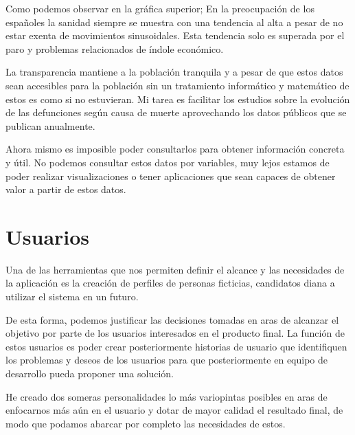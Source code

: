 Como podemos observar en la gráfica superior; En la preocupación de los españoles la sanidad siempre se muestra con una tendencia al alta a pesar de no estar exenta de movimientos sinusoidales. Esta tendencia solo es superada por el paro y problemas relacionados de índole económico.

La transparencia mantiene a la población tranquila y a pesar de que estos datos sean accesibles para la población sin un tratamiento informático y matemático de estos es como si no estuvieran. Mi tarea es facilitar los estudios sobre la evolución de las defunciones según causa de muerte aprovechando los datos públicos que se publican anualmente.

Ahora mismo es imposible poder consultarlos para obtener información concreta y útil. No podemos consultar estos datos por variables, muy lejos estamos de poder realizar visualizaciones o tener aplicaciones que sean capaces de obtener valor a partir de estos datos.

\section{Usuarios}
\label{sec:usu}
Una de las herramientas que nos permiten definir el alcance y las necesidades de la aplicación es la creación de perfiles de personas ficticias, candidatos diana a utilizar el sistema en un futuro.

De esta forma, podemos justificar las decisiones tomadas en aras de alcanzar el objetivo por parte de los usuarios interesados en el producto final. La función de estos usuarios es poder crear posteriormente historias de usuario que identifiquen los problemas y deseos de los usuarios para que posteriormente en equipo de desarrollo pueda proponer una solución.

He creado dos someras personalidades lo más variopintas posibles en aras
de enfocarnos más aún en el usuario y dotar de mayor calidad el resultado final, de modo que podamos abarcar por completo las necesidades de estos.

